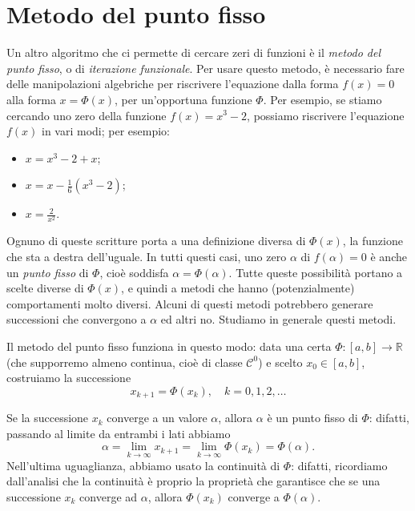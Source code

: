 \documentclass[a4paper]{report}
\theoremstyle{definition}
\theoremstyle{remark}
\begin{document}
\section{Metodo del punto fisso}

Un altro algoritmo che ci permette di cercare zeri di funzioni è il \emph{metodo del punto fisso}, o di \emph{iterazione funzionale}. Per usare questo metodo, è necessario fare delle manipolazioni algebriche per riscrivere l'equazione dalla forma $f(x) = 0$ alla forma $x = \Phi(x)$, per un'opportuna funzione $\Phi$. Per esempio, se stiamo cercando uno zero della funzione $f(x) = x^3 - 2$, possiamo riscrivere l'equazione $f(x)$ in vari modi; per esempio: 
\begin{itemize}
    \item $x = x^3 - 2 + x$;
    \item $x = x - \frac16 (x^3-2)$;
    \item $x = \frac{2}{x^2}$.
\end{itemize}
Ognuno di queste scritture porta a una definizione diversa di $\Phi(x)$, la funzione che sta a destra dell'uguale. In tutti questi casi, uno zero $\alpha$ di $f(\alpha)=0$ è anche un \emph{punto fisso} di $\Phi$, cioè soddisfa $\alpha = \Phi(\alpha)$. Tutte queste possibilità portano a scelte diverse di $\Phi(x)$, e quindi a metodi che hanno (potenzialmente) comportamenti molto diversi. Alcuni di questi metodi potrebbero generare successioni che convergono a $\alpha$ ed altri no. Studiamo in generale questi metodi.

Il metodo del punto fisso funziona in questo modo: data una certa $\Phi:[a,b] \to \mathbb{R}$ (che supporremo almeno continua, cioè di classe $\mathcal{C}^0$) e scelto $x_0 \in [a,b]$, costruiamo la successione
\begin{equation} \label{puntofisso}
    x_{k+1} = \Phi(x_k), \quad k=0,1,2,\dots    
\end{equation}

Se la successione $x_k$ converge a un valore $\alpha$, allora $\alpha$ è un punto fisso di $\Phi$: difatti, passando al limite da entrambi i lati abbiamo
\[
\alpha = \lim_{k\to\infty} x_{k+1} = \lim_{k\to\infty} \Phi(x_k) = \Phi(\alpha).
\]
Nell'ultima uguaglianza, abbiamo usato la continuità di $\Phi$: difatti, ricordiamo dall'analisi che la continuità è proprio la proprietà che garantisce che se una successione $x_k$ converge ad $\alpha$, allora $\Phi(x_k)$ converge a $\Phi(\alpha)$.
\end{document}
